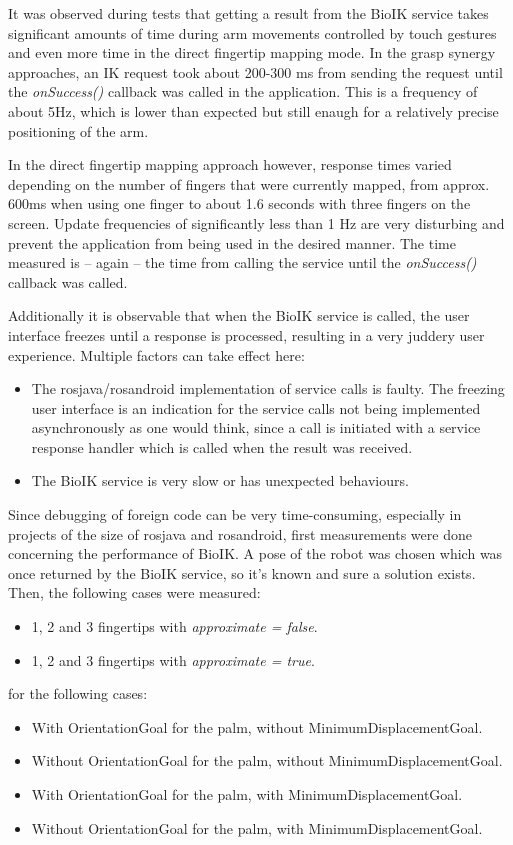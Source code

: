 It was observed during tests that getting a result from the BioIK service takes significant amounts of time during arm movements controlled by touch gestures and even more time in the direct fingertip mapping mode. In the grasp synergy approaches, an IK request took about 200-300 ms from sending the request until the \textit{onSuccess()} callback was called in the application. This is a frequency of about 5Hz, which is lower than expected but still enaugh for a relatively precise positioning of the arm.

In the direct fingertip mapping approach however, response times varied depending on the number of fingers that were currently mapped, from approx. 600ms when using one finger to about 1.6 seconds with three fingers on the screen. Update frequencies of significantly less than 1 Hz are very disturbing and prevent the application from being used in the desired manner. The time measured is -- again -- the time from calling the service until the \textit{onSuccess()} callback was called. 

Additionally it is observable that when the BioIK service is called, the user interface freezes until a response is processed, resulting in a very juddery user experience. Multiple factors can take effect here:
\begin{itemize}
	\item The rosjava/rosandroid implementation of service calls is faulty. The freezing user interface is an indication for the service calls not being implemented asynchronously as one would think, since a call is initiated with a service response handler which is called when the result was received.
	\item The BioIK service is very slow or has unexpected behaviours.
\end{itemize}

Since debugging of foreign code can be very time-consuming, especially in projects of the size of rosjava and rosandroid, first measurements were done concerning the performance of BioIK. A pose of the robot was chosen which was once returned by the BioIK service, so it's known and sure a solution exists. Then, the following cases were measured:
\begin{itemize}
	\item 1, 2 and 3 fingertips with \textit{approximate = false}.
	\item 1, 2 and 3 fingertips with \textit{approximate = true}.
\end{itemize}

for the following cases:
\begin{itemize}
	\item With OrientationGoal for the palm, without MinimumDisplacementGoal.
	\item Without OrientationGoal for the palm, without MinimumDisplacementGoal.
	\item With OrientationGoal for the palm, with MinimumDisplacementGoal.
	\item Without OrientationGoal for the palm, with MinimumDisplacementGoal.
\end{itemize}

